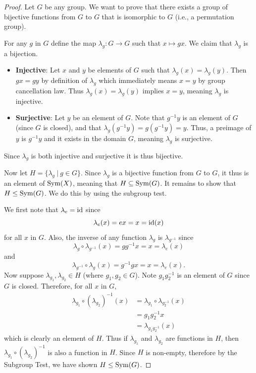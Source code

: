 \begin{proof}
    Let $G$ be any group. We want to prove that there exists a group of bijective functions from $G$ to $G$ that is isomorphic to $G$ (i.e., a permutation group).

    For any $g$ in $G$ define the map $\lambda_g: G \to G$ such that $x \mapsto gx$. We claim that $\lambda_g$ is a bijection.
    \begin{itemize}
        \item \textbf{Injective}: Let $x$ and $y$ be elements of $G$ such that $\lambda_g(x) = \lambda_g(y)$. Then $gx = gy$ by definition of $\lambda_g$ which immediately means $x = y$ by group cancellation law. Thus $\lambda_g(x) = \lambda_g(y)$ implies $x = y$, meaning $\lambda_g$ is injective.
        
        \item \textbf{Surjective}: Let $y$ be an element of $G$. Note that $g^{-1}y$ is an element of $G$ (since $G$ is closed), and that $\lambda_g(g^{-1}y) = g(g^{-1}y) = y$. Thus, a preimage of $y$ is $g^{-1}y$ and it exists in the domain $G$, meaning $\lambda_g$ is surjective.
    \end{itemize}
    Since $\lambda_g$ is both injective and surjective it is thus bijective.

    Now let $H = \{\lambda_g \ | \ g \in G\}$. Since $\lambda_g$ is a bijective function from $G$ to $G$, it thus is an element of $\mathrm{Sym}(X)$, meaning that $H \subseteq \mathrm{Sym}(G)$. It remains to show that $H \leq \mathrm{Sym}(G)$. We do this by using the subgroup test.

    We first note that $\lambda_e = \mathrm{id}$ since
    \[
        \lambda_e(x) = ex = x = \mathrm{id}(x)
    \]
    for all $x$ in $G$. Also, the inverse of any function $\lambda_g$ is $\lambda_{g^{-1}}$ since
    \[
        \lambda_g \circ \lambda_{g^{-1}}(x) = gg^{-1}x = x = \lambda_e(x)
    \]
    and
    \[
        \lambda_{g^{-1}} \circ \lambda_g(x) = g^{-1}gx = x = \lambda_e(x).
    \]
    Now suppose $\lambda_{g_1}, \lambda_{g_2} \in H$ (where $g_1, g_2 \in G$). Note $g_1g_2^{-1}$ is an element of $G$ since $G$ is closed. Therefore, for all $x$ in $G$,
    \begin{align*}
        \lambda_{g_1} \circ \left(\lambda_{g_2}\right)^{-1}(x) &= \lambda_{g_1}\circ\lambda_{g_2^{-1}}(x)\\
        &= g_1g_2^{-1}x\\
        &= \lambda_{g_1g_2^{-1}}(x)
    \end{align*}
    which is clearly an element of $H$. Thus if $\lambda_{g_1}$ and $\lambda_{g_2}$ are functions in $H$, then $\lambda_{g_1} \circ \left(\lambda_{g_2}\right)^{-1}$ is also a function in $H$. Since $H$ is non-empty, therefore by the Subgroup Test, we have shown $H \leq \mathrm{Sym}(G)$.


\end{proof}
